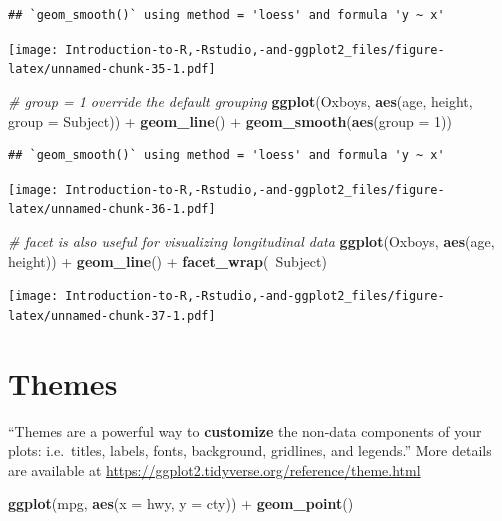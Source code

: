 \documentclass[]{book}
\newenvironment{Shaded}{\begin{snugshade}}{\end{snugshade}}
\newcommand{\KeywordTok}[1]{\textcolor[rgb]{0.13,0.29,0.53}{\textbf{{#1}}}}
\newcommand{\DataTypeTok}[1]{\textcolor[rgb]{0.13,0.29,0.53}{{#1}}}
\newcommand{\DecValTok}[1]{\textcolor[rgb]{0.00,0.00,0.81}{{#1}}}
\newcommand{\StringTok}[1]{\textcolor[rgb]{0.31,0.60,0.02}{{#1}}}
\newcommand{\CommentTok}[1]{\textcolor[rgb]{0.56,0.35,0.01}{\textit{{#1}}}}
\newcommand{\NormalTok}[1]{{#1}}
\begin{document}
\begin{verbatim}
## `geom_smooth()` using method = 'loess' and formula 'y ~ x'
\end{verbatim}

\texttt{[image: Introduction-to-R,-Rstudio,-and-ggplot2\_files/figure-latex/unnamed-chunk-35-1.pdf]}

\begin{Shaded}
\begin{Highlighting}[]
\CommentTok{# group = 1 override the default grouping }
\KeywordTok{ggplot}\NormalTok{(Oxboys, }\KeywordTok{aes}\NormalTok{(age, height, }\DataTypeTok{group =} \NormalTok{Subject)) +}\StringTok{ }\KeywordTok{geom_line}\NormalTok{() +}\StringTok{ }\KeywordTok{geom_smooth}\NormalTok{(}\KeywordTok{aes}\NormalTok{(}\DataTypeTok{group =} \DecValTok{1}\NormalTok{))}
\end{Highlighting}
\end{Shaded}

\begin{verbatim}
## `geom_smooth()` using method = 'loess' and formula 'y ~ x'
\end{verbatim}

\texttt{[image: Introduction-to-R,-Rstudio,-and-ggplot2\_files/figure-latex/unnamed-chunk-36-1.pdf]}

\begin{Shaded}
\begin{Highlighting}[]
\CommentTok{# facet is also useful for visualizing longitudinal data}
\KeywordTok{ggplot}\NormalTok{(Oxboys, }\KeywordTok{aes}\NormalTok{(age, height)) +}\StringTok{ }\KeywordTok{geom_line}\NormalTok{() +}\StringTok{ }\KeywordTok{facet_wrap}\NormalTok{(~Subject)}
\end{Highlighting}
\end{Shaded}

\texttt{[image: Introduction-to-R,-Rstudio,-and-ggplot2\_files/figure-latex/unnamed-chunk-37-1.pdf]}

\section{Themes}\label{themes}

``Themes are a powerful way to \textbf{customize} the non-data
components of your plots: i.e.~titles, labels, fonts, background,
gridlines, and legends.'' More details are available at
\url{https://ggplot2.tidyverse.org/reference/theme.html}

\begin{Shaded}
\begin{Highlighting}[]
\KeywordTok{ggplot}\NormalTok{(mpg, }\KeywordTok{aes}\NormalTok{(}\DataTypeTok{x =} \NormalTok{hwy, }\DataTypeTok{y =} \NormalTok{cty)) +}\StringTok{ }\KeywordTok{geom_point}\NormalTok{() }
\end{Highlighting}
\end{Shaded}
\end{document}
